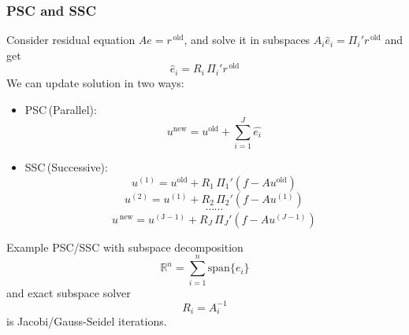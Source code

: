 \begin{frame}
\frametitle{PSC and SSC}
Consider residual equation $Ae=r^{\,\mathrm{old}}$, 
and solve it in subspaces
$A_i\hat{e}_i=\Pi_i'r^{\,\mathrm{old}}$
and get $$\hat{e}_i=R_i\,\Pi_i'r^{\,\mathrm{old}}$$
We can update solution in two ways:
\begin{itemize}
\item PSC\,(Parallel):$$u^{\mathrm{new}}=u^{\mathrm{old}}+\sum_{i=1}^J\hat{e_i}$$
\item SSC\,(Successive): $$u^{(1)}=u^{\mathrm{old}}+R_1\,\Pi_1'(f-Au^{\mathrm{old}})$$
$$u^{(2)}=u^{\mathrm{(1)}}+R_2\,\Pi_2'(f-Au^{(1)})$$
$$\cdots \cdots$$
$$u^{\,\mathrm{new}}=u^{\mathrm{(J-1)}}+R_J\,\Pi_J'(f-Au^{(J-1)})$$
\end{itemize}
\end{frame}

\begin{frame}
\begin{block}{Example}
PSC/SSC with subspace decomposition
$$\mathbb{R}^n=\sum_{i=1}^{n}\mathrm{span}\{e_i\}$$
and exact subspace solver $$R_i=A_i^{-1}$$ is Jacobi/Gauss-Seidel iterations.
\end{block}
\end{frame}